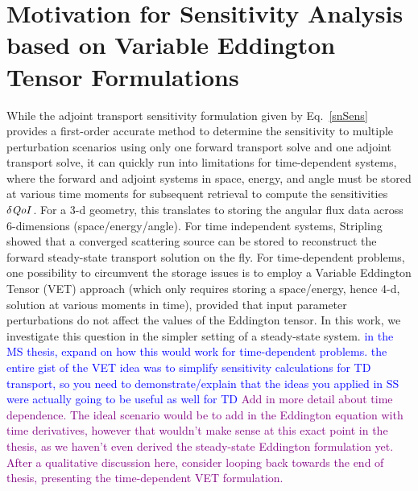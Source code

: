 \documentclass[12pt]{report}
\newcommand{\qoi}{{\it QoI}\xspace}
\newcommand{\comment}[2]{\marginpar{\textcolor{#2}{$\star$}}\textcolor{#2}{#1}\newline}
\newcommand{\jcr}[1]{\comment{#1}{blue}}
\newcommand{\todo}[1]{\comment{#1}{purple}}
\newcommand{\jcr}[1]{\phantom{a}}
\newcommand{\todo}[1]{\phantom{a}}
\begin{document}
\section{Motivation for Sensitivity Analysis based on Variable Eddington Tensor Formulations}

While the adjoint transport sensitivity formulation given by Eq.~\eqref{snSens} provides a first-order accurate method to determine the sensitivity to multiple perturbation scenarios using only one forward transport solve and one adjoint transport solve, it can quickly run into limitations for time-dependent systems, where the forward and adjoint systems in space, energy, and angle must be stored at various time moments for subsequent retrieval to compute the sensitivities $\delta \qoi$. For a 3-d geometry, this translates to storing the angular
flux data across 6-dimensions (space/energy/angle). For time independent systems, Stripling \cite{Stripling} showed that a converged scattering source can be stored to reconstruct 
the forward steady-state transport solution on the fly. For time-dependent problems, one possibility to circumvent the storage issues is to employ a Variable Eddington Tensor (VET) approach (which only requires
storing a space/energy, hence 4-d, solution at various moments in time), provided that input parameter perturbations do not affect the values of the Eddington tensor. In this work,
we investigate this question in the simpler setting of a steady-state system.
\jcr{in the MS thesis, expand on how this would work for time-dependent problems. the entire
gist of the VET idea was to simplify sensitivity calculations for TD transport, so you need
to demonstrate/explain that the ideas you applied in SS were actually going to be useful as well for TD}
\todo{Add in more detail about time dependence. The ideal scenario would be to add in the Eddington equation with time derivatives, however that wouldn't make sense at this exact point in the thesis, as we haven't even derived the steady-state Eddington formulation yet. After a qualitative discussion here, consider looping back towards the end of thesis, presenting the time-dependent VET formulation.}
\end{document}
